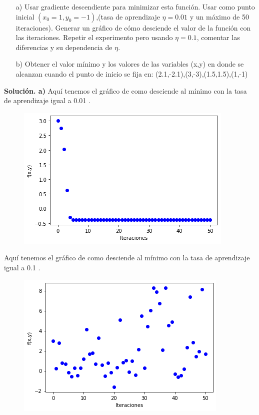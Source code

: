 \documentclass[a4paper,11pt]{article}
\begin{document}
\begin{enumerate}
\item[a)]Usar gradiente descendiente para minimizar esta función. Usar como punto inicial $(x_{0}=1,y_{0}=-1)$,(tasa de aprendizaje $\eta=0.01$ y un máximo de 50 iteraciones). Generar un gráfico de cómo desciende el valor de la función con las iteraciones. Repetir el experimento pero usando $\eta=0.1$, comentar las diferencias y su dependencia de $\eta$.
\item[b)]Obtener el valor mínimo y los valores de las variables (x,y) en donde se alcanzan cuando el punto de inicio se fija en: (2.1,-2.1),(3,-3),(1.5,1.5),(1,-1)
\end{enumerate}
\newpage
\textbf{Solución. a)}
Aquí tenemos el gráfico de como desciende al mínimo con la tasa de aprendizaje igual a 0.01 . \\

\begin{figure}[h]
\includegraphics[scale=0.6]{grafica1ej3a}
\centering
\end{figure}

Aquí tenemos el gráfico de como desciende al mínimo con la tasa de aprendizaje igual a 0.1 .

\begin{figure}[h]
\includegraphics[scale=0.6]{grafica2ej3a}
\centering
\end{figure}
\end{document}
